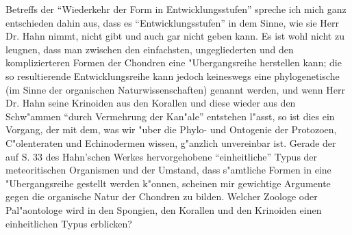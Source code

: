 \documentclass[a4paper, 12pt, oneside]{article}
\begin{document}
Betreffs der "`Wiederkehr der Form in Entwicklungsstufen"' spreche ich mich ganz entschieden dahin aus, dass es "`Entwicklungsstufen"' in dem Sinne, wie sie Herr Dr. Hahn nimmt, nicht gibt und auch gar nicht geben kann. Es ist wohl nicht zu leugnen, dass man zwischen den einfachsten, ungegliederten und den komplizierteren Formen der Chondren eine "Ubergangsreihe herstellen kann; die so resultierende Entwicklungsreihe kann jedoch keineswegs eine phylogenetische (im Sinne der organischen Naturwissenschaften) genannt werden, und wenn Herr Dr. Hahn seine Krinoiden aus den Korallen und diese wieder aus den Schw"ammen "`durch Vermehrung der Kan"ale"' entstehen l"asst, so ist dies ein Vorgang, der mit dem, was wir "uber die Phylo- und Ontogenie der Protozoen, C"olenteraten und Echinodermen wissen, g"anzlich unvereinbar ist. Gerade der auf S. 33 des Hahn'schen Werkes hervorgehobene "`einheitliche"' Typus der meteoritischen Organismen und der Umstand, dass s"amtliche Formen in eine "Ubergangsreihe gestellt werden k"onnen, scheinen mir gewichtige Argumente gegen die organische Natur der Chondren zu bilden. Welcher Zoologe oder Pal"aontologe wird in den Spongien, den Korallen und den Krinoiden einen einheitlichen Typus erblicken?
\end{document}
